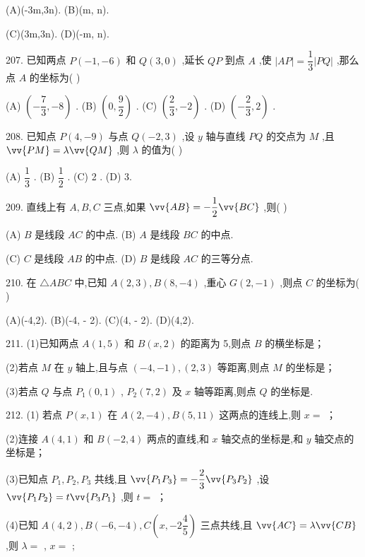 (A)(-3m,3n). (B)(m, n).

(C)(3m,3n). (D)(-m, n).

207. 已知两点 $P\left( {-1, - 6}\right)$ 和 $Q\left( {3,0}\right)$ ,延长 ${QP}$ 到点 $A$ ,使 $\left| {AP}\right|  = \dfrac{1}{3}\left| {PQ}\right|$ ,那么点 $A$ 的坐标为(   )

(A) $\left( {-\dfrac{7}{3}, - 8}\right)$ . (B) $\left( {0,\dfrac{9}{2}}\right)$ . (C) $\left( {\dfrac{2}{3}, - 2}\right)$ . (D) $\left( {-\dfrac{2}{3},2}\right)$ .

208. 已知点 $P\left( {4, - 9}\right)$ 与点 $Q\left( {-2,3}\right)$ ,设 $y$ 轴与直线 ${PQ}$ 的交点为 $M$ ,且 $\vv{PM} = \lambda \vv{QM}$ ,则 $\lambda$ 的值为(   )

(A) $\dfrac{1}{3}$ . (B) $\dfrac{1}{2}$ . (C) 2 . (D) 3.

209. 直线上有 $A,B,C$ 三点,如果 $\vv{AB} =  - \dfrac{1}{2}\vv{BC}$ ,则(   )

(A) $B$ 是线段 ${AC}$ 的中点. (B) $A$ 是线段 ${BC}$ 的中点.

(C) $C$ 是线段 ${AB}$ 的中点. (D) $B$ 是线段 ${AC}$ 的三等分点.

210. 在 $\bigtriangleup {ABC}$ 中,已知 $A\left( {2,3}\right) ,B\left( {8, - 4}\right)$ ,重心 $G\left( {2, - 1}\right)$ ,则点 $C$ 的坐标为(   )

(A)(-4,2). (B)(-4, - 2). (C)(4, - 2). (D)(4,2).

211. (1)已知两点 $A\left( {1,5}\right)$ 和 $B\left( {x,2}\right)$ 的距离为 5,则点 $B$ 的横坐标是\blkda{}；

(2)若点 $M$ 在 $y$ 轴上,且与点 $\left( {-4, - 1}\right) ,\left( {2,3}\right)$ 等距离,则点 $M$ 的坐标是\blkda{}；

(3)若点 $Q$ 与点 ${P}_{1}\left( {0,1}\right)$ , ${P}_{2}\left( {7,2}\right)$ 及 $x$ 轴等距离,则点 $Q$ 的坐标是\blkda{}.

212. (1) 若点 $P\left( {x,1}\right)$ 在 $A\left( {2, - 4}\right) ,B\left( {5,{11}}\right)$ 这两点的连线上,则 $x =$ \blkda{}；

(2)连接 $A\left( {4,1}\right)$ 和 $B\left( {-2,4}\right)$ 两点的直线,和 $x$ 轴交点的坐标是\blkda{},和 $y$ 轴交点的坐标是\blkda{}；

(3)已知点 ${P}_{1},{P}_{2},{P}_{3}$ 共线,且 $\vv{{P}_{1}{P}_{3}} =  - \dfrac{2}{3}\vv{{P}_{3}{P}_{2}}$ ,设 $\vv{{P}_{1}{P}_{2}} = t\vv{{P}_{3}{P}_{1}}$ ,则 $t =$ \blkda{}；

(4)已知 $A\left( {4,2}\right) ,B\left( {-6, - 4}\right) ,C\left( {x, - 2\dfrac{4}{5}}\right)$ 三点共线,且 $\vv{AC} = \lambda \vv{CB}$ ,则 $\lambda  =$ \blkda{}, $x =$ \blkda{};

